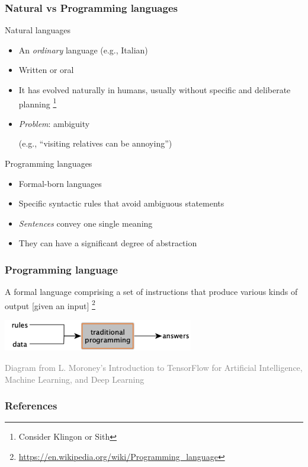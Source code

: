 \documentclass[xcolor=x11names,handout]{beamer}
\newcommand{\light}[1]{\textcolor{gray}{#1}}
\begin{document}
\begin{frame}
\frametitle{Natural vs Programming languages}

\alert{Natural languages}

\begin{itemize}
\item An \textit{ordinary} language (e.g., Italian)
\item Written or oral
\item It has evolved naturally in humans, usually without specific and 
deliberate planning%
\footnote{Consider Klingon or Sith}
\item \textit{Problem}: ambiguity

(e.g., ``visiting relatives can be annoying'')
\end{itemize}
\pause

\alert{Programming languages}
\begin{itemize}
\item Formal-born languages
\item Specific syntactic rules that avoid ambiguous statements
\item \textit{Sentences} convey one single meaning
\item They can have a significant degree of abstraction
\end{itemize}
\end{frame}

\begin{frame}
\frametitle{Programming language}

A formal language comprising a set of instructions that produce various kinds 
of 
output [given an input]%
\footnote{\url{https://en.wikipedia.org/wiki/Programming_language}}
\bigskip
\pause

\begin{center}
\includegraphics[width=83mm]{img/01_programming.png}
\end{center}
\bigskip 

\footnotesize \light{Diagram from L. Moroney's Introduction to TensorFlow for 
Artificial Intelligence, Machine Learning, and Deep Learning}
\end{frame}



\begin{frame}[allowframebreaks]
\frametitle{References}


\end{frame}
\end{document}
